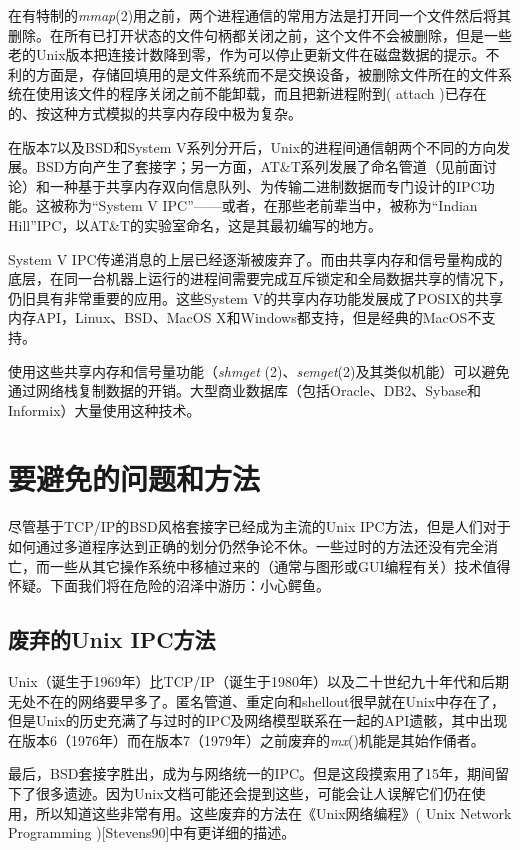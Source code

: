\documentclass[12pt,oneside]{book}
\begin{document}
\begin{common-format}
在有特制的\textit{mmap}(2)用之前，两个进程通信的常用方法是打开同一个文件然后将其删除。在所有已打开状态的文件句柄都关闭之前，这个文件不会被删除，但是一些老的Unix版本把连接计数降到零，作为可以停止更新文件在磁盘数据的提示。不利的方面是，存储回填用的是文件系统而不是交换设备，被删除文件所在的文件系统在使用该文件的程序关闭之前不能卸载，而且把新进程附到( attach )已存在的、按这种方式模拟的共享内存段中极为复杂。

在版本7以及BSD和System V系列分开后，Unix的进程间通信朝两个不同的方向发展。BSD方向产生了套接字；另一方面，AT\&{}T系列发展了命名管道（见前面讨论）和一种基于共享内存双向信息队列、为传输二进制数据而专门设计的IPC功能。这被称为“System V IPC”——或者，在那些老前辈当中，被称为“Indian Hill”IPC，以AT\&{}T的实验室命名，这是其最初编写的地方。

System V IPC传递消息的上层已经逐渐被废弃了。而由共享内存和信号量构成的底层，在同一台机器上运行的进程间需要完成互斥锁定和全局数据共享的情况下，仍旧具有非常重要的应用。这些System V的共享内存功能发展成了POSIX的共享内存API，Linux、BSD、MacOS X和Windows都支持，但是经典的MacOS不支持。

使用这些共享内存和信号量功能（\textit{shmget }(2)、\textit{semget}(2)及其类似机能）可以避免通过网络栈复制数据的开销。大型商业数据库（包括Oracle、DB2、Sybase和Informix）大量使用这种技术。



\section{要避免的问题和方法}
尽管基于TCP/IP的BSD风格套接字已经成为主流的Unix IPC方法，但是人们对于如何通过多道程序达到正确的划分仍然争论不休。一些过时的方法还没有完全消亡，而一些从其它操作系统中移植过来的（通常与图形或GUI编程有关）技术值得怀疑。下面我们将在危险的沼泽中游历：小心鳄鱼。


\subsection{废弃的Unix IPC方法}
Unix（诞生于1969年）比TCP/IP（诞生于1980年）以及二十世纪九十年代和后期无处不在的网络要早多了。匿名管道、重定向和shellout很早就在Unix中存在了，但是Unix的历史充满了与过时的IPC及网络模型联系在一起的API遗骸，其中出现在版本6（1976年）而在版本7（1979年）之前废弃的\textit{mx}()机能是其始作俑者。

最后，BSD套接字胜出，成为与网络统一的IPC。但是这段摸索用了15年，期间留下了很多遗迹。因为Unix文档可能还会提到这些，可能会让人误解它们仍在使用，所以知道这些非常有用。这些废弃的方法在《Unix网络编程》( Unix Network Programming )[Stevens90]中有更详细的描述。


\end{common-format}
\end{document}
